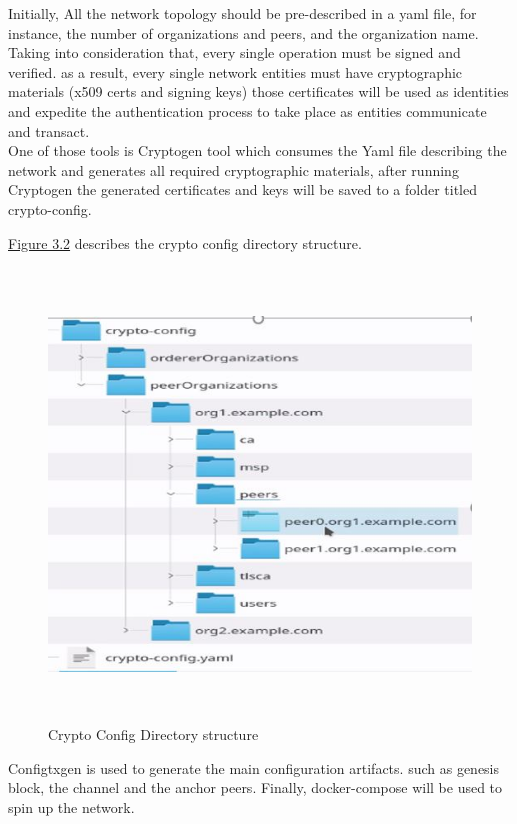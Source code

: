 Initially, All the network topology should be pre-described in a yaml file, for instance, the number of organizations and peers, and the organization name. 
Taking into consideration that, every single operation must be signed and verified. as a result, every single network entities must have cryptographic materials (x509 certs and signing keys) those certificates will be used as identities and expedite the authentication process to take place as entities communicate and transact.  \\ 
One of those tools is Cryptogen tool which consumes the Yaml file describing the network and generates all required cryptographic materials, after running Cryptogen the generated certificates and keys will be saved to a folder titled crypto-config.

\clearpage 

\noindent \hyperref[fig:cryptoconfig]{Figure 3.2} describes the crypto config directory structure.  
 \begin{figure}[H]
\includegraphics[width=15cm,height=12cm]{images/cryptoconfig.jpg}
\caption{Crypto Config Directory structure}
\label{fig:cryptoconfig}
\end{figure}


\noindent Configtxgen is used to generate the main configuration artifacts. such as genesis block, the channel and the anchor peers. 
Finally, docker-compose will be used to spin up the network. 

